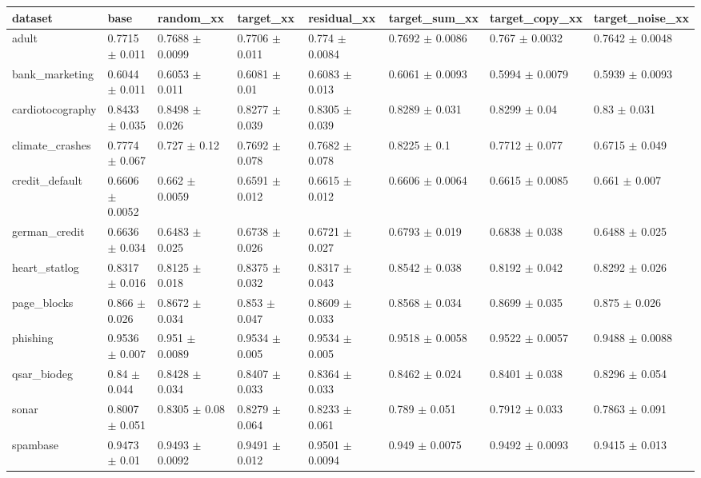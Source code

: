 \begin{tabular}{llllllll}
\toprule
dataset & base & random\_xx & target\_xx & residual\_xx & target\_sum\_xx & target\_copy\_xx & target\_noise\_xx \\
\midrule
adult & 0.7715 $\pm$ 0.011 & 0.7688 $\pm$ 0.0099 & 0.7706 $\pm$ 0.011 & 0.774 $\pm$ 0.0084 & 0.7692 $\pm$ 0.0086 & 0.767 $\pm$ 0.0032 & 0.7642 $\pm$ 0.0048 \\
bank\_marketing & 0.6044 $\pm$ 0.011 & 0.6053 $\pm$ 0.011 & 0.6081 $\pm$ 0.01 & 0.6083 $\pm$ 0.013 & 0.6061 $\pm$ 0.0093 & 0.5994 $\pm$ 0.0079 & 0.5939 $\pm$ 0.0093 \\
cardiotocography & 0.8433 $\pm$ 0.035 & 0.8498 $\pm$ 0.026 & 0.8277 $\pm$ 0.039 & 0.8305 $\pm$ 0.039 & 0.8289 $\pm$ 0.031 & 0.8299 $\pm$ 0.04 & 0.83 $\pm$ 0.031 \\
climate\_crashes & 0.7774 $\pm$ 0.067 & 0.727 $\pm$ 0.12 & 0.7692 $\pm$ 0.078 & 0.7682 $\pm$ 0.078 & 0.8225 $\pm$ 0.1 & 0.7712 $\pm$ 0.077 & 0.6715 $\pm$ 0.049 \\
credit\_default & 0.6606 $\pm$ 0.0052 & 0.662 $\pm$ 0.0059 & 0.6591 $\pm$ 0.012 & 0.6615 $\pm$ 0.012 & 0.6606 $\pm$ 0.0064 & 0.6615 $\pm$ 0.0085 & 0.661 $\pm$ 0.007 \\
german\_credit & 0.6636 $\pm$ 0.034 & 0.6483 $\pm$ 0.025 & 0.6738 $\pm$ 0.026 & 0.6721 $\pm$ 0.027 & 0.6793 $\pm$ 0.019 & 0.6838 $\pm$ 0.038 & 0.6488 $\pm$ 0.025 \\
heart\_statlog & 0.8317 $\pm$ 0.016 & 0.8125 $\pm$ 0.018 & 0.8375 $\pm$ 0.032 & 0.8317 $\pm$ 0.043 & 0.8542 $\pm$ 0.038 & 0.8192 $\pm$ 0.042 & 0.8292 $\pm$ 0.026 \\
page\_blocks & 0.866 $\pm$ 0.026 & 0.8672 $\pm$ 0.034 & 0.853 $\pm$ 0.047 & 0.8609 $\pm$ 0.033 & 0.8568 $\pm$ 0.034 & 0.8699 $\pm$ 0.035 & 0.875 $\pm$ 0.026 \\
phishing & 0.9536 $\pm$ 0.007 & 0.951 $\pm$ 0.0089 & 0.9534 $\pm$ 0.005 & 0.9534 $\pm$ 0.005 & 0.9518 $\pm$ 0.0058 & 0.9522 $\pm$ 0.0057 & 0.9488 $\pm$ 0.0088 \\
qsar\_biodeg & 0.84 $\pm$ 0.044 & 0.8428 $\pm$ 0.034 & 0.8407 $\pm$ 0.033 & 0.8364 $\pm$ 0.033 & 0.8462 $\pm$ 0.024 & 0.8401 $\pm$ 0.038 & 0.8296 $\pm$ 0.054 \\
sonar & 0.8007 $\pm$ 0.051 & 0.8305 $\pm$ 0.08 & 0.8279 $\pm$ 0.064 & 0.8233 $\pm$ 0.061 & 0.789 $\pm$ 0.051 & 0.7912 $\pm$ 0.033 & 0.7863 $\pm$ 0.091 \\
spambase & 0.9473 $\pm$ 0.01 & 0.9493 $\pm$ 0.0092 & 0.9491 $\pm$ 0.012 & 0.9501 $\pm$ 0.0094 & 0.949 $\pm$ 0.0075 & 0.9492 $\pm$ 0.0093 & 0.9415 $\pm$ 0.013 \\

\end{tabular}
